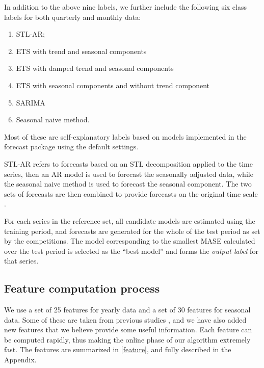 \documentclass[11pt,a4paper,]{article}
\providecommand{\tightlist}{%
  \setlength{\itemsep}{0pt}\setlength{\parskip}{0pt}}
\begin{document}
In addition to the above nine labels, we further include the following
six class labels for both quarterly and monthly data:

\begin{enumerate}
\def\labelenumi{(\alph{enumi})}
\setcounter{enumi}{9}
\tightlist
\item
  STL-AR;
\item
  ETS with trend and seasonal components
\item
  ETS with damped trend and seasonal components
\item
  ETS with seasonal components and without trend component
\item
  SARIMA
\item
  Seasonal naive method.
\end{enumerate}

Most of these are self-explanatory labels based on models implemented in
the forecast package using the default settings.

STL-AR refers to forecasts based on an STL decomposition applied to the
time series, then an AR model is used to forecast the seasonally
adjusted data, while the seasonal naive method is used to forecast the
seasonal component. The two sets of forecasts are then combined to
provide forecasts on the original time scale
\autocite{hyndman2014forecasting}.

For each series in the reference set, all candidate models are estimated
using the training period, and forecasts are generated for the whole of
the test period as set by the competitions. The model corresponding to
the smallest MASE \autocite{hyndman2006another} calculated over the test
period is selected as the ``best model'' and forms the \emph{output
label} for that series.

\subsection{Feature computation process}\label{sec:features}

We use a set of 25 features for yearly data and a set of 30 features for
seasonal data. Some of these are taken from previous studies
\autocites{wang2009rule}{hyndman2015large}{kang2017visualising}, and we
have also added new features that we believe provide some useful
information. Each feature can be computed rapidly, thus making the
online phase of our algorithm extremely fast. The features are
summarized in \autoref{feature}, and fully described in the Appendix.
\end{document}
